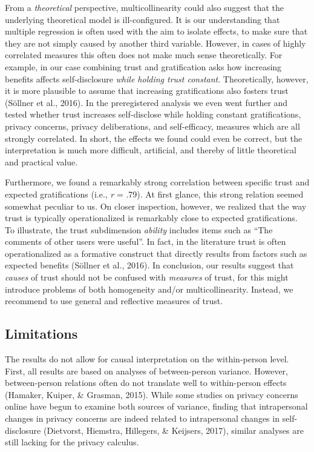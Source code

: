 \documentclass[
  english,
  man,floatsintext]{apa6}
\begin{document}
From a \emph{theoretical} perspective, multicollinearity could also suggest that the underlying theoretical model is ill-configured.
It is our understanding that multiple regression is often used with the aim to isolate effects, to make sure that they are not simply caused by another third variable.
However, in cases of highly correlated measures this often does not make much sense theoretically.
For example, in our case combining trust and gratification asks how increasing benefits affects self-disclosure \emph{while holding trust constant}.
Theoretically, however, it is more plausible to assume that increasing gratifications also fosters trust (Söllner et al., 2016).
In the preregistered analysis we even went further and tested whether trust increases self-disclose while holding constant gratifications, privacy concerns, privacy deliberations, and self-efficacy, measures which are all strongly correlated.
In short, the effects we found could even be correct, but the interpretation is much more difficult, artificial, and thereby of little theoretical and practical value.

Furthermore, we found a remarkably strong correlation between specific trust and expected gratifications (i.e., \emph{r} = .79).
At first glance, this strong relation seemed somewhat peculiar to us.
On closer inspection, however, we realized that the way trust is typically operationalized is remarkably close to expected gratifications.
To illustrate, the trust subdimension \emph{ability} includes items such as \enquote{The comments of other users were useful}.
In fact, in the literature trust is often operationalized as a formative construct that directly results from factors such as expected benefits (Söllner et al., 2016).
In conclusion, our results suggest that \emph{causes} of trust should not be confused with \emph{measures} of trust, for this might introduce problems of both homogeneity and/or multicollinearity.
Instead, we recommend to use general and reflective measures of trust.

\hypertarget{limitations}{%
\subsection{Limitations}\label{limitations}}

The results do not allow for causal interpretation on the within-person level.
First, all results are based on analyses of between-person variance.
However, between-person relations often do not translate well to within-person effects (Hamaker, Kuiper, \& Grasman, 2015).
While some studies on privacy concerns online have begun to examine both sources of variance, finding that intrapersonal changes in privacy concerns are indeed related to intrapersonal changes in self-disclosure (Dietvorst, Hiemstra, Hillegers, \& Keijsers, 2017), similar analyses are still lacking for the privacy calculus.
\end{document}
